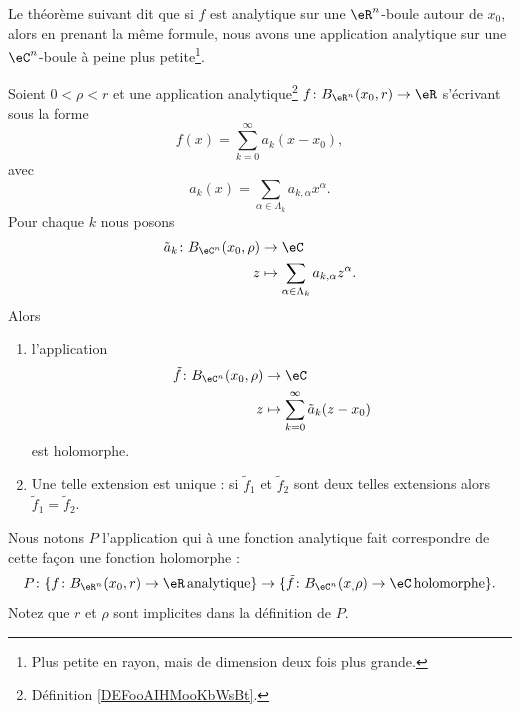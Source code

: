 Le théorème suivant dit que si \( f\) est analytique sur une \( \eR^{n}\)-boule autour de \( x_0\), alors en prenant la même formule, nous avons une application analytique sur une \( \eC^n\)-boule à peine plus petite\footnote{Plus petite en rayon, mais de dimension deux fois plus grande.}.
\begin{theorem}	\label{THOooXJNJooFucWqn}
	Soient \( 0<\rho<r\) et une application analytique\footnote{Définition \ref{DEFooAIHMooKbWsBt}.} \(f \colon B_{\eR^n}(x_0,r)\to \eR  \) s'écrivant sous la forme
	\begin{equation}
		f(x)=\sum_{k=0}^{\infty} a_k(x-x_0),
	\end{equation}
	avec
	\begin{equation}
		a_k(x)=\sum_{\alpha\in\Lambda_k}a_{k,\alpha}x^{\alpha}.
	\end{equation}
	Pour chaque \( k\) nous posons
	\begin{equation}
		\begin{aligned}
			\tilde a_k\colon B_{\eC^n}(x_0,\rho) & \to \eC                                                   \\
			z                                    & \mapsto \sum_{\alpha\in \Lambda_k}a_{k,\alpha}z^{\alpha}.
		\end{aligned}
	\end{equation}
	Alors
	\begin{enumerate}
		\item
		      l'application
		      \begin{equation}
			      \begin{aligned}
				      \tilde f\colon B_{\eC^n}(x_0,\rho) & \to \eC                                      \\
				      z                                  & \mapsto \sum_{k=0}^{\infty}\tilde a_k(z-x_0)
			      \end{aligned}
		      \end{equation}
		      est holomorphe.
		\item
		      Une telle extension est unique : si \( \tilde f_1\) et \( \tilde f_2\) sont deux telles extensions alors \( \tilde f_1=\tilde f_2\).
	\end{enumerate}

	Nous notons \( P\) l'application qui à une fonction analytique fait correspondre de cette façon une fonction holomorphe :
	\begin{equation}
		P \colon \{f \colon B_{\eR^n}(x_0,r)\to \eR\, \text{analytique}   \} \to \{  \tilde f \colon B_{\eC^n}(x_,\rho)\to \eC\,\text{holomorphe}     \} 	.
	\end{equation}
	Notez que \( r\) et \( \rho\) sont implicites dans la définition de \( P\).
\end{theorem}

